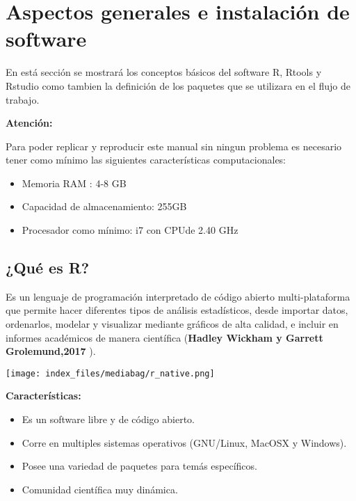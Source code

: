 \documentclass[
  letterpaper,
  DIV=11,
  numbers=noendperiod]{scrreprt}
\providecommand{\tightlist}{%
  \setlength{\itemsep}{0pt}\setlength{\parskip}{0pt}}\usepackage{longtable,booktabs,array}
\begin{document}
\hypertarget{aspectos-generales-e-instalaciuxf3n-de-software}{%
\chapter{Aspectos generales e instalación de
software}\label{aspectos-generales-e-instalaciuxf3n-de-software}}

En está sección se mostrará los conceptos básicos del software R, Rtools
y Rstudio como tambien la definición de los paquetes que se utilizara en
el flujo de trabajo.

\begin{tcolorbox}[enhanced jigsaw, opacityback=0, toprule=.15mm, colback=white, breakable, arc=.35mm, colframe=quarto-callout-note-color-frame, leftrule=.75mm, rightrule=.15mm, left=2mm, bottomrule=.15mm]

\textbf{Atención:}\vspace{2mm}

Para poder replicar y reproducir este manual sin ningun problema es
necesario tener como mínimo las siguientes características
computacionales:

\begin{itemize}
\tightlist
\item
  Memoria RAM : 4-8 GB
\item
  Capacidad de almacenamiento: 255GB
\item
  Procesador como mínimo: i7 con CPUde 2.40 GHz
\end{itemize}

\end{tcolorbox}

\hypertarget{quuxe9-es-r}{%
\section{¿Qué es R?}\label{quuxe9-es-r}}

Es un lenguaje de programación interpretado de código abierto
multi-plataforma que permite hacer diferentes tipos de análisis
estadísticos, desde importar datos, ordenarlos, modelar y visualizar
mediante gráficos de alta calidad, e incluir en informes académicos de
manera científica (\textbf{Hadley Wickham y Garrett Grolemund,2017} ).

\texttt{[image: index\_files/mediabag/r\_native.png]}

\textbf{Características:}

\begin{itemize}
\tightlist
\item
  Es un software libre y de código abierto.
\item
  Corre en multiples sistemas operativos (GNU/Linux, MacOSX y Windows).
\item
  Posee una variedad de paquetes para temás específicos.
\item
  Comunidad científica muy dinámica.
\end{itemize}
\end{document}

